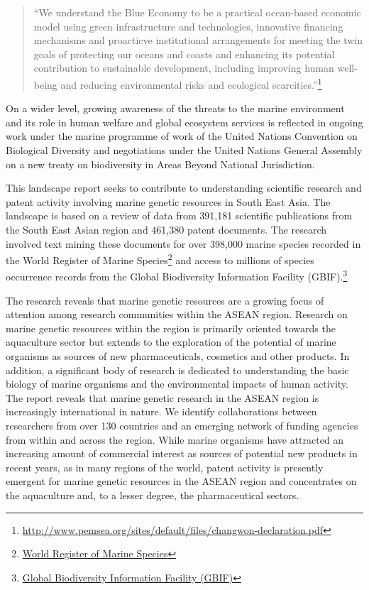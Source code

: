 \documentclass[]{book}
\theoremstyle{definition}
\theoremstyle{definition}
\theoremstyle{definition}
\theoremstyle{remark}
\begin{document}
\begin{quote}
``We understand the Blue Economy to be a practical ocean-based economic
model using green infrastructure and technologies, innovative financing
mechanisms and proacticve institutional arrangements for meeting the
twin goals of protecting our oceans and coasts and enhancing its
potential contribution to sustainable development, including improving
human well-being and reducing environmental risks and ecological
scarcities.''\footnote{\url{http://www.pemsea.org/sites/default/files/changwon-declaration.pdf}}
\end{quote}

On a wider level, growing awareness of the threats to the marine
environment and its role in human welfare and global ecosystem services
is reflected in ongoing work under the marine programme of work of the
United Nations Convention on Biological Diversity and negotiations under
the United Nations General Assembly on a new treaty on biodiversity in
Areas Beyond National Jurisdiction.

This landscape report seeks to contribute to understanding scientific
research and patent activity involving marine genetic resources in South
East Asia. The landscape is based on a review of data from 391,181
scientific publications from the South East Asian region and 461,380
patent documents. The research involved text mining these documents for
over 398,000 marine species recorded in the World Register of Marine
Species\footnote{\href{http://www.marinespecies.org/}{World Register of
  Marine Species}} and access to millions of species occurrence records
from the Global Biodiversity Information Facility (GBIF).\footnote{\href{https://www.gbif.org/}{Global
  Biodiversity Information Facility (GBIF)}}

The research reveals that marine genetic resources are a growing focus
of attention among research communities within the ASEAN region.
Research on marine genetic resources within the region is primarily
oriented towards the aquaculture sector but extends to the exploration
of the potential of marine organisms as sources of new pharmaceuticals,
cosmetics and other products. In addition, a significant body of
research is dedicated to understanding the basic biology of marine
organisms and the environmental impacts of human activity. The report
reveals that marine genetic research in the ASEAN region is increasingly
international in nature. We identify collaborations between researchers
from over 130 countries and an emerging network of funding agencies from
within and across the region. While marine organisms have attracted an
increasing amount of commercial interest as sources of potential new
products in recent years, as in many regions of the world, patent
activity is presently emergent for marine genetic resources in the ASEAN
region and concentrates on the aquaculture and, to a lesser degree, the
pharmaceutical sectors.
\end{document}
